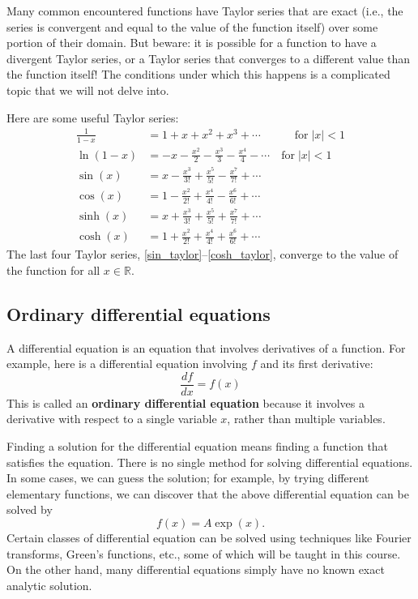 \documentclass[10pt,a4paper]{article}
\begin{document}
Many common encountered functions have Taylor series that are exact
(i.e., the series is convergent and equal to the value of the function
itself) over some portion of their domain. But beware: it is possible
for a function to have a divergent Taylor series, or a Taylor series
that converges to a different value than the function itself! The
conditions under which this happens is a complicated topic that we
will not delve into.

Here are some useful Taylor series:
\begin{align}
  \frac{1}{1-x} &= 1 + x + x^2 + x^3 + \cdots
  \qquad\quad \mathrm{for} \; |x| < 1  \\
  \ln(1-x) &= -x - \frac{x^2}{2} - \frac{x^3}{3} - \frac{x^4}{4} - \cdots \quad \mathrm{for} \; |x| < 1 \\
  \sin(x) &= x - \frac{x^3}{3!} + \frac{x^5}{5!} - \frac{x^7}{7!} + \cdots
  \label{sin_taylor} \\
  \cos(x) &= 1 - \frac{x^2}{2!} + \frac{x^4}{4!} - \frac{x^6}{6!} + \cdots
  \label{cos_taylor} \\
  \sinh(x) &= x + \frac{x^3}{3!} + \frac{x^5}{5!} + \frac{x^7}{7!} + \cdots \\
  \cosh(x) &= 1 + \frac{x^2}{2!} + \frac{x^4}{4!} + \frac{x^6}{6!} + \cdots
  \label{cosh_taylor}
\end{align}
The last four Taylor series, \eqref{sin_taylor}--\eqref{cosh_taylor},
converge to the value of the function for all $x\in\mathbb{R}$.

\subsection{Ordinary differential equations}
\label{ordinary-differential-equations}

A differential equation is an equation that involves derivatives of a
function. For example, here is a differential equation involving $f$
and its first derivative:
\begin{equation}
  \frac{df}{dx} = f(x)
\end{equation}
This is called an \textbf{ordinary differential equation} because it
involves a derivative with respect to a single variable $x$, rather
than multiple variables.

Finding a solution for the differential equation means finding a
function that satisfies the equation. There is no single method for
solving differential equations. In some cases, we can guess the
solution; for example, by trying different elementary functions, we
can discover that the above differential equation can be solved by
\begin{equation}
  f(x) = A \exp(x).
\end{equation}
Certain classes of differential equation can be solved using techniques
like Fourier transforms, Green's functions, etc., some of which will be
taught in this course. On the other hand, many differential equations
simply have no known exact analytic solution.
\end{document}
